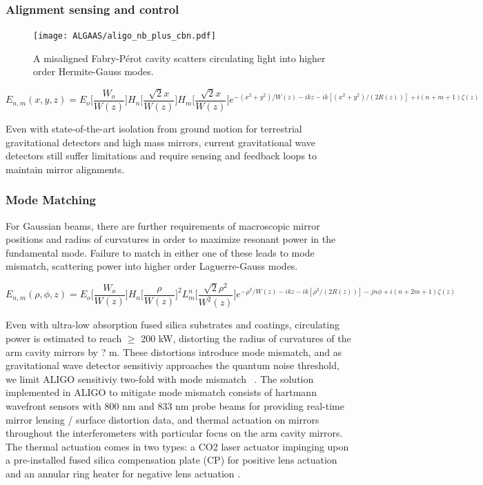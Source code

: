 \subsubsection{Alignment sensing and control}

\begin{figure}[H]
    \begin{center}
    \texttt{[image: ALGAAS/aligo\_nb\_plus\_cbn.pdf]}
    \end{center}
    \caption{A misaligned Fabry-P\'{e}rot cavity scatters circulating light into higher order Hermite-Gauss modes.}
\label{fig:aligo_tn_comparison}
\end{figure}

\begin{equation}
	E_{n,m}(x,y,z) = E_o \bigg[ \frac{W_o}{W(z)} \bigg] H_n \bigg[ \frac{\sqrt{2}x}{W(z)} \bigg] H_m \bigg[ \frac{\sqrt{2}x}{W(z)} \bigg] e^{-(x^2 + y^2)/W(z) - ikz - ik[(x^2 + y^2)/(2R(z))] + i(n + m + 1)\zeta(z)}
\end{equation}

Even with state-of-the-art isolation from ground motion for terrestrial gravitational detectors and high mass mirrors, current gravitational wave detectors still suffer limitations and require sensing and feedback loops to maintain mirror alignments.

\subsubsection{Mode Matching}
For Gaussian beams, there are further requirements of macroscopic mirror positions and radius of curvatures in order to  maximize resonant power in the fundamental mode. Failure to match in either one of these leads to mode mismatch, scattering power into higher order Laguerre-Gauss modes.  

\begin{equation}
	E_{n,m}(\rho, \phi, z) =  E_o \bigg[ \frac{W_o}{W(z)} \bigg] H_n \bigg[ \frac{\rho}{W(z)} \bigg]^2 L^n_m \bigg[ \frac{\sqrt{2}\rho^2}{W^2(z)} \bigg] e^{-\rho^2/W(z) - ikz - ik[\rho^2/(2R(z))] - jn \phi + i(n + 2m + 1)\zeta(z)}
\end{equation}

Even with ultra-low absorption fused silica substrates and coatings, circulating power is estimated to reach $\geq$ 200 kW, distorting the radius of curvatures of the arm cavity mirrors by ? m. These distortions introduce mode mismatch, and as gravitational wave detector sensitiviy approaches the quantum noise threshold, we limit ALIGO sensitiviy two-fold with mode mismatch ~\cite{}. The solution implemented in ALIGO to mitigate mode mismatch consists of hartmann wavefront sensors with 800 nm and 833 nm probe beams for providing real-time mirror lensing / surface distortion data, and thermal actuation on mirrors throughout the interferometers with particular focus on the arm cavity mirrors. The thermal actuation comes in two types: a CO2 laser actuator impinging upon a pre-installed fused silica compensation plate (CP) for positive lens actuation and an annular ring heater for negative lens actuation \cite{}. 

